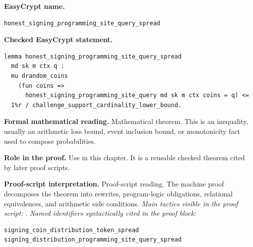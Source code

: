 \begin{formaltheorem}
\noindent\textbf{EasyCrypt name.}
\begin{lstlisting}[language=EasyCrypt,basicstyle=\ttfamily\scriptsize]
honest_signing_programming_site_query_spread
\end{lstlisting}
\noindent\textbf{Checked EasyCrypt statement.}
\begin{lstlisting}[language=EasyCrypt,basicstyle=\ttfamily\scriptsize]
lemma honest_signing_programming_site_query_spread
  md sk m ctx q :
  mu drandom_coins
    (fun coins =>
      honest_signing_programming_site_query md sk m ctx coins = q) <=
  1%r / challenge_support_cardinality_lower_bound.
\end{lstlisting}
\noindent\textbf{Formal mathematical reading.}
Mathematical theorem. This is an inequality, usually an arithmetic loss bound, event inclusion bound, or monotonicity fact used to compose probabilities.

\noindent\textbf{Role in the proof.}
Use in this chapter. It is a reusable checked theorem cited by later proof scripts.

\noindent\textbf{Proof-script interpretation.}
Proof-script reading. The machine proof decomposes the theorem into rewrites, program-logic obligations, relational equivalences, and arithmetic side conditions.
\emph{Main tactics visible in the proof script:} .
\emph{Named identifiers syntactically cited in the proof block:}
\begin{lstlisting}[language=EasyCrypt,basicstyle=\ttfamily\scriptsize]
signing_coin_distribution_token_spread
signing_distribution_programming_site_query_spread
\end{lstlisting}

\end{formaltheorem}

